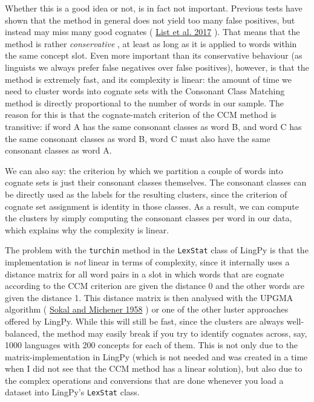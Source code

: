 \documentclass[
  english,
  a4paper,
  oneside,tablecaptionabove
]{scrbook}
\newcommand{\passthrough}[1]{#1}
\begin{document}
Whether this is a good idea or not, is in fact not important. Previous
tests have shown that the method in general does not yield too many
false positives, but instead may miss many good cognates (
\href{http://bibliography.lingpy.org?key=List2017c}{List et al. 2017} ).
That means that the method is rather \emph{conservative} , at least as
long as it is applied to words within the same concept slot. Even more
important than its conservative behaviour (as linguists we always prefer
false negatives over false positives), however, is that the method is
extremely fast, and its complexity is linear: the amount of time we need
to cluster words into cognate sets with the Consonant Class Matching
method is directly proportional to the number of words in our sample.
The reason for this is that the cognate-match criterion of the CCM
method is transitive: if word A has the same consonant classes as word
B, and word C has the same consonant classes as word B, word C must also
have the same consonant classes as word A.

We can also say: the criterion by which we partition a couple of words
into cognate sets is just their consonant classes themselves. The
consonant classes can be directly used as the labels for the resulting
clusters, since the criterion of cognate set assignment is identity in
those classes. As a result, we can compute the clusters by simply
computing the consonant classes per word in our data, which explains why
the complexity is linear.

The problem with the \passthrough{\lstinline!turchin!} method in the
\passthrough{\lstinline!LexStat!} class of LingPy is that the
implementation is \emph{not} linear in terms of complexity, since it
internally uses a distance matrix for all word pairs in a slot in which
words that are cognate according to the CCM criterion are given the
distance 0 and the other words are given the distance 1. This distance
matrix is then analysed with the UPGMA algorithm (
\href{http://bibliography.lingpy.org?key=Sokal1958}{Sokal and Michener
1958} ) or one of the other luster approaches offered by LingPy. While
this will still be fast, since the clusters are always well-balanced,
the method may easily break if you try to identify cognates across, say,
1000 languages with 200 concepts for each of them. This is not only due
to the matrix-implementation in LingPy (which is not needed and was
created in a time when I did not see that the CCM method has a linear
solution), but also due to the complex operations and conversions that
are done whenever you load a dataset into LingPy's
\passthrough{\lstinline!LexStat!} class.
\end{document}

